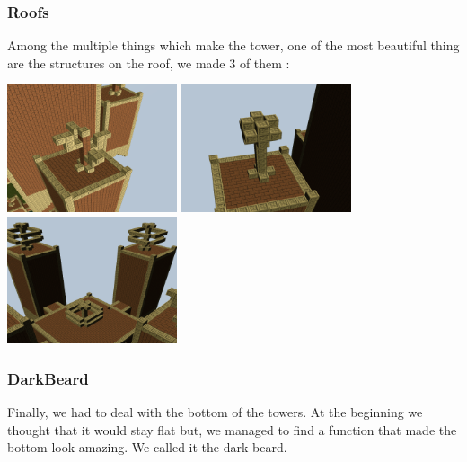 \documentclass[article]{report}         %
\begin{document}
        \subsubsection{Roofs}
          Among the multiple things which make the tower, one of the most beautiful thing are the structures on the roof, we made 3 of them :
          \begin{center}
            \includegraphics[width=5cm]{images/DT/roof1.png}
            \includegraphics[width=5cm]{images/DT/roof2.png}
            \includegraphics[width=5cm]{images/DT/roof3.png}
          \end{center}
        \subsubsection{DarkBeard}
          Finally, we had to deal with the bottom of the towers. At the beginning we thought that it would stay flat but, we managed to find a function that made the bottom look amazing. We called it the dark beard.
\end{document}
